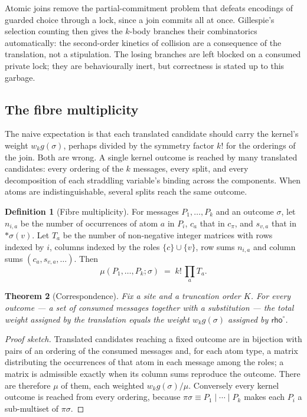 \documentclass[11pt,a4paper]{article}
\theoremstyle{plain}
\newtheorem{theorem}{Theorem}[section]
\theoremstyle{definition}
\newtheorem{definition}[theorem]{Definition}
\theoremstyle{remark}
\newcommand{\krho}{\textsf{rho}^{\circ}}
\newcommand{\scong}{\equiv}
\begin{document}
Atomic joins remove the partial-commitment problem that defeats encodings of
guarded choice through a lock, since a join commits all at once. Gillespie's
selection counting then gives the $k$-body branches their combinatorics
automatically: the second-order kinetics of collision are a consequence of the
translation, not a stipulation. The losing branches are left blocked on a
consumed private lock; they are behaviourally inert, but correctness is stated
up to this garbage.

\subsection{The fibre multiplicity}

The naive expectation is that each translated candidate should carry the
kernel's weight $w_k g(\sigma)$, perhaps divided by the symmetry factor $k!$
for the orderings of the join. Both are wrong. A single kernel outcome is
reached by many translated candidates: every ordering of the $k$ messages,
every split, and every decomposition of each straddling variable's binding
across the components. When atoms are indistinguishable, several splits reach
the same outcome.

\begin{definition}[Fibre multiplicity]\label{def:mu}
For messages $P_1,\dots,P_k$ and an outcome $\sigma$, let $n_{i,a}$ be the
number of occurrences of atom $a$ in $P_i$, $c_a$ that in $c_\pi$, and
$s_{v,a}$ that in $*\sigma(v)$. Let $T_a$ be the number of non-negative integer
matrices with rows indexed by $i$, columns indexed by the roles
$\{c\}\cup\{v\}$, row sums $n_{i,a}$ and column sums $(c_a, s_{v,a},\dots)$. Then
\[
\mu(P_1,\dots,P_k;\sigma) \;=\; k!\,\prod_a T_a .
\]
\end{definition}

\begin{theorem}[Correspondence]\label{thm:corr}
Fix a site and a truncation order $K$. For every outcome --- a set of consumed
messages together with a substitution --- the total weight assigned by the
translation equals the weight $w_k g(\sigma)$ assigned by $\krho$.
\end{theorem}

\begin{proof}[Proof sketch]
Translated candidates reaching a fixed outcome are in bijection with pairs of
an ordering of the consumed messages and, for each atom type, a matrix
distributing the occurrences of that atom in each message among the roles; a
matrix is admissible exactly when its column sums reproduce the outcome. There
are therefore $\mu$ of them, each weighted $w_kg(\sigma)/\mu$. Conversely every
kernel outcome is reached from every ordering, because $\pi\sigma\scong
P_1\mid\cdots\mid P_k$ makes each $P_i$ a sub-multiset of $\pi\sigma$.
\end{proof}
\end{document}
